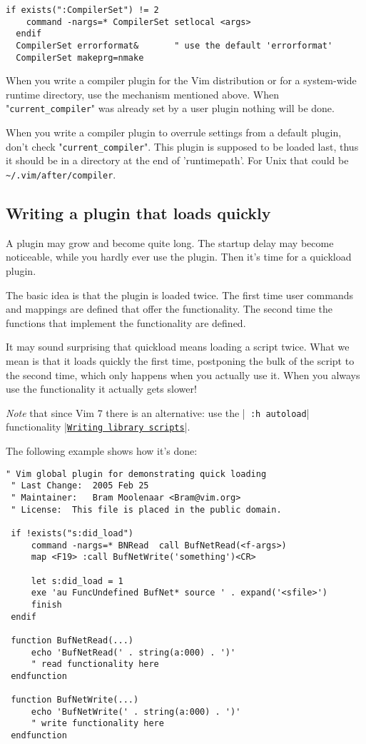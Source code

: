 \begin{Verbatim}[samepage=true]
  if exists(":CompilerSet") != 2
    command -nargs=* CompilerSet setlocal <args>
  endif
  CompilerSet errorformat&       " use the default 'errorformat'
  CompilerSet makeprg=nmake
\end{Verbatim}

When you write a compiler plugin for the Vim distribution or for a system-wide runtime directory, use the mechanism mentioned above.
When "\verb!current_compiler!" was already set by a user plugin nothing will be done.

When you write a compiler plugin to overrule settings from a default plugin, don't check "\verb!current_compiler!".
This plugin is supposed to be loaded last, thus it should be in a directory at the end of 'runtimepath'.
For Unix that could be \verb!~/.vim/after/compiler!.
\subsection{Writing a plugin that loads quickly}
\label{write-plugin-quickload}
A plugin may grow and become quite long.
The startup delay may become noticeable, while you hardly ever use the plugin.
Then it's time for a quickload plugin.

The basic idea is that the plugin is loaded twice.
The first time user commands and mappings are defined that offer the functionality.
The second time the functions that implement the functionality are defined.

It may sound surprising that quickload means loading a script twice.
What we mean is that it loads quickly the first time, postponing the bulk of the script to the second time, which only happens when you actually use it.
When you always use the functionality it actually gets slower!

\emph{Note} that since Vim 7 there is an alternative: use the |\verb! :h autoload!| functionality |\hyperref[Writing library scripts]{\texttt{Writing library scripts}}|.

The following example shows how it's done:

\begin{Verbatim}[samepage=true]
 " Vim global plugin for demonstrating quick loading
 " Last Change:  2005 Feb 25
 " Maintainer:   Bram Moolenaar <Bram@vim.org>
 " License:  This file is placed in the public domain.

 if !exists("s:did_load")
     command -nargs=* BNRead  call BufNetRead(<f-args>)
     map <F19> :call BufNetWrite('something')<CR>

     let s:did_load = 1
     exe 'au FuncUndefined BufNet* source ' . expand('<sfile>')
     finish
 endif

 function BufNetRead(...)
     echo 'BufNetRead(' . string(a:000) . ')'
     " read functionality here
 endfunction

 function BufNetWrite(...)
     echo 'BufNetWrite(' . string(a:000) . ')'
     " write functionality here
 endfunction
\end{Verbatim}

